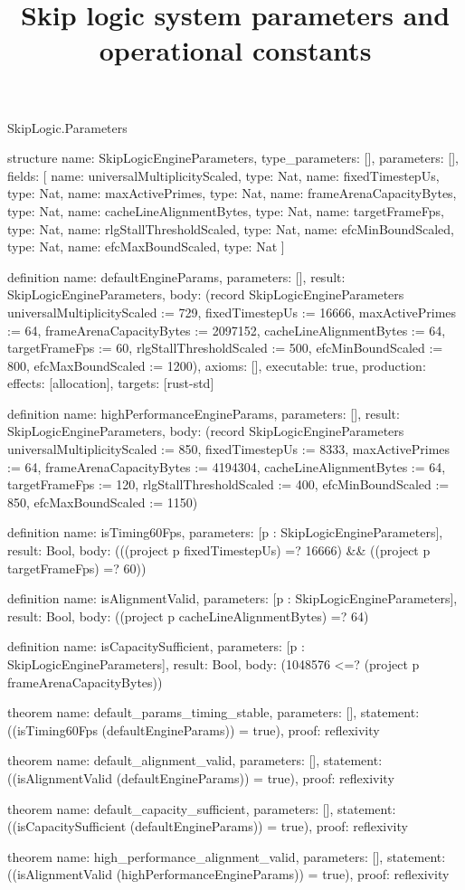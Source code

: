 \begin{lexlean}{SkipLogic.Parameters}
\title{Skip logic system parameters and operational constants}
\begin{semanticmodule}
structure{
  name: SkipLogicEngineParameters,
  type_parameters: [],
  parameters: [],
  fields: [
    {name: universalMultiplicityScaled, type: Nat},
    {name: fixedTimestepUs, type: Nat},
    {name: maxActivePrimes, type: Nat},
    {name: frameArenaCapacityBytes, type: Nat},
    {name: cacheLineAlignmentBytes, type: Nat},
    {name: targetFrameFps, type: Nat},
    {name: rlgStallThresholdScaled, type: Nat},
    {name: efcMinBoundScaled, type: Nat},
    {name: efcMaxBoundScaled, type: Nat}
  ]
}

definition{
  name: defaultEngineParams,
  parameters: [],
  result: SkipLogicEngineParameters,
  body: (record SkipLogicEngineParameters {universalMultiplicityScaled := 729, fixedTimestepUs := 16666, maxActivePrimes := 64, frameArenaCapacityBytes := 2097152, cacheLineAlignmentBytes := 64, targetFrameFps := 60, rlgStallThresholdScaled := 500, efcMinBoundScaled := 800, efcMaxBoundScaled := 1200}),
  axioms: [],
  executable: true,
  production: {effects: [allocation], targets: [rust-std]}
}

definition{
  name: highPerformanceEngineParams,
  parameters: [],
  result: SkipLogicEngineParameters,
  body: (record SkipLogicEngineParameters {universalMultiplicityScaled := 850, fixedTimestepUs := 8333, maxActivePrimes := 64, frameArenaCapacityBytes := 4194304, cacheLineAlignmentBytes := 64, targetFrameFps := 120, rlgStallThresholdScaled := 400, efcMinBoundScaled := 850, efcMaxBoundScaled := 1150})
}

definition{
  name: isTiming60Fps,
  parameters: [p : SkipLogicEngineParameters],
  result: Bool,
  body: (((project p fixedTimestepUs) =? 16666) && ((project p targetFrameFps) =? 60))
}

definition{
  name: isAlignmentValid,
  parameters: [p : SkipLogicEngineParameters],
  result: Bool,
  body: ((project p cacheLineAlignmentBytes) =? 64)
}

definition{
  name: isCapacitySufficient,
  parameters: [p : SkipLogicEngineParameters],
  result: Bool,
  body: (1048576 <=? (project p frameArenaCapacityBytes))
}

theorem{
  name: default_params_timing_stable,
  parameters: [],
  statement: ((isTiming60Fps (defaultEngineParams)) = true),
  proof: reflexivity{}
}

theorem{
  name: default_alignment_valid,
  parameters: [],
  statement: ((isAlignmentValid (defaultEngineParams)) = true),
  proof: reflexivity{}
}

theorem{
  name: default_capacity_sufficient,
  parameters: [],
  statement: ((isCapacitySufficient (defaultEngineParams)) = true),
  proof: reflexivity{}
}

theorem{
  name: high_performance_alignment_valid,
  parameters: [],
  statement: ((isAlignmentValid (highPerformanceEngineParams)) = true),
  proof: reflexivity{}
}
\end{semanticmodule}
\end{lexlean}
